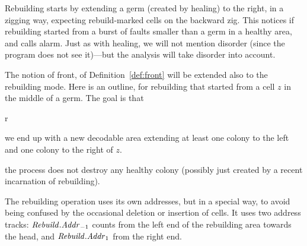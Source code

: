 \documentclass[11pt]{memoir}
\theoremstyle{definition} %
\newcommand{\fld}[1]{\ensuremath{\textit{#1\/}}}
\newcommand{\Addr}{\fld{Addr}}
\newcommand{\Rebuild}{\fld{Rebuild}} %
\begin{document}
Rebuilding starts by extending a germ (created by healing) to the right, in a zigging way,
expecting rebuild-marked cells on the backward zig.
This notices if rebuilding started from a burst of faults smaller than a germ
in a healthy area, and calls alarm.
Just as with healing, we will not mention disorder (since the program does not see it)---but
the analysis will take disorder into account.

The notion of front, of Definition~\ref{def:front} will be extended also to the rebuilding mode.
Here is an outline, for rebuilding that started from a cell \( z \) in the middle
of a germ.
The goal is that
\begin{varenum}{r}
\item\label{i:rebuild-size} we end up with a new decodable area
  extending at least one colony to the left and one colony to the right of \( z \).
\item\label{i:keep-healthy} the process does not destroy any healthy colony
  (possibly just created by a recent incarnation of rebuilding).
\end{varenum}

The rebuilding operation uses its own addresses, but in a special way, to avoid being
confused by the occasional deletion or insertion of cells.
It uses two address tracks: 
\( \Rebuild.\Addr_{-1} \) counts from the left end of the rebuilding area towards the head,
and \( \Rebuild.\Addr_{1} \) from the right end.

\end{document}
